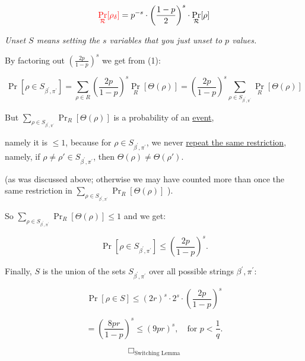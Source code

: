 \[
\textcolor{red}{\Pr_{\mathcal{R}} [\rho_{\delta}]} = p^{-s} \cdot \left( \frac{1-p}{2} \right)^s \cdot \Pr_{\mathcal{R}} [\rho]
\]

\textit{Unset \( S \) means setting the \( s \) variables that you just unset to \( p \) values.}

By factoring out \( \left( \frac{2p}{1 - p} \right)^s \) we get from (1):

\[
\Pr \left[ \rho \in S_{\beta^{'},\pi^{'}} \right] = \sum_{\rho \in R} \left( \frac{2p}{1 - p} \right)^s \Pr_R [\Theta(\rho)]
= \left( \frac{2p}{1 - p} \right)^s \sum_{\rho \in S_{\beta^{'},\pi^{'}}} \Pr_R [\Theta(\rho)]
\]

But \( \sum_{\rho \in S_{\beta^{'},\pi^{'}}} \Pr_R [\Theta(\rho)] \) is a probability of an \underline{event}, 

namely it is \( \leq 1 \), because for \( \rho \in S_{\beta^{'},\pi^{'}} \), we never 
\underline{repeat the same restriction}, namely, if \( \rho \neq \rho' \in S_{\beta^{'},\pi^{'}} \), then \( \Theta(\rho) \neq \Theta(\rho') \).

(as was discussed above; otherwise we may have counted more than once the same restriction in \( \sum_{\rho \in S_{\beta^{'},\pi^{'}}} \Pr_R [\Theta(\rho)] \) ).

So \( \sum_{\rho \in S_{\beta^{'},\pi^{'}}} \Pr_R [\Theta(\rho)] \leq 1 \) and we get:

\[
\Pr \left[ \rho \in S_{\beta^{'},\pi^{'}} \right] \leq \left( \frac{2p}{1 - p} \right)^s.
\]

Finally, \( S \) is the union of the sets \( S_{\beta^{'},\pi^{'}} \) over all possible strings \( \beta^{'},\pi^{'} \):

\[
\Pr \left[ \rho \in S \right] \leq (2r)^s \cdot 2^s \cdot \left( \frac{2p}{1 - p} \right)^s
\]

\[
= \left( \frac{8 p r}{1 - p} \right)^s \leq (9 p r)^s, \quad \text{for } p < \frac{1}{q}.
\]

\[
\Box_{\text{Switching Lemma}}
\]



